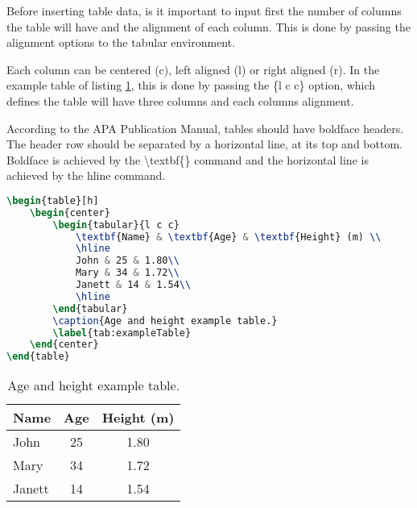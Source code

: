 	Before inserting table data, is it important to input first the number of columns the table will have and the alignment of each column. This is done by passing the alignment options to the {\ttfamily tabular} environment.

	Each column can be centered ({\ttfamily c}), left aligned ({\ttfamily l}) or right aligned ({\ttfamily r}). In the example table of listing \ref{tab:exampleTable}, this is done by passing the {\ttfamily \{l c c\}} option, which defines the table will have three columns and each columns alignment.

	According to the APA Publication Manual, tables should have boldface headers. The header row should be separated by a horizontal line, at its top and bottom. Boldface is achieved by the {\ttfamily \textbackslash textbf\{\}} command and the horizontal line is achieved by the {\ttfamily hline} command.

\begin{lstlisting}[caption = {Example table (table \ref{tab:exampleTable})}, label = {lst:exampleTable}, style = prettyListing, language = tex]
\begin{table}[h]
	\begin{center}
		\begin{tabular}{l c c}
			\textbf{Name} & \textbf{Age} & \textbf{Height} (m) \\
			\hline
			John & 25 & 1.80\\
			Mary & 34 & 1.72\\
			Janett & 14 & 1.54\\
			\hline
		\end{tabular}
		\caption{Age and height example table.}
		\label{tab:exampleTable}
	\end{center}
\end{table}
\end{lstlisting}

\begin{table}[h]
\caption{Age and height example table.}
\label{tab:exampleTable}
	\begin{center}
		\begin{tabular}{l c c}
			\hline
			\textbf{Name} & \textbf{Age} & \textbf{Height} (m) \\
			\hline
			John & 25 & 1.80\\
			Mary & 34 & 1.72\\
			Janett & 14 & 1.54\\
			\hline
		\end{tabular}
	\end{center}
\end{table}

